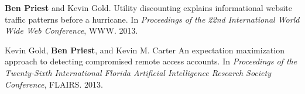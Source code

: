 \documentclass[10pt]{article}
\renewcommand{\section}[1]{\pagebreak[3]%
    \vspace{1.0\baselineskip}%
    \phantomsection\addcontentsline{toc}{section}{#1}%
    \noindent\llap{\scshape\smash{\parbox[t]{\marginparwidth}{\hyphenpenalty=10000\raggedright #1}}}%
    \vspace{-\baselineskip}\par}
\begin{document}
\begin{bibenum}
\item \textbf{Ben Priest} and Kevin Gold.
	Utility discounting explains informational website traffic patterns before a hurricane.
	In \emph{Proceedings of the 22nd International World Wide Web Conference}, 
	WWW. 
	2013.

\item Kevin Gold, \textbf{Ben Priest}, and Kevin M. Carter
	An expectation maximization approach to detecting compromised remote access accounts.
	In \emph{Proceedings of the Twenty-Sixth International Florida Artificial Intelligence Research Society Conference}, 
	FLAIRS. 
	2013.

\end{bibenum}


%
%
%
%
%
%



\end{document}
